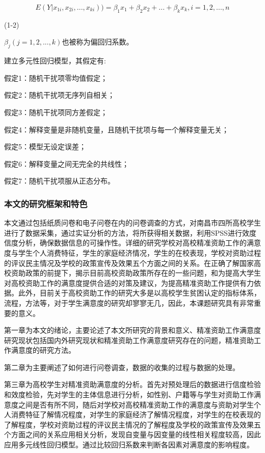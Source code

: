 \documentclass[UTF8,a4paper,12pt]{ctexart}  %
\begin{document}
\[E(Y|x_{1i},x_{2i},...,x_{ki}))=\beta_{1}x_{1}+\beta_{2}x_{2}+...+\beta_{k}x_{k},i=1,2,...,n\]

(1-2)

\(\beta_{j}(j=1,2,...,k)\)也被称为偏回归系数。

建立多元性回归模型，其假定有:

假定1：随机干扰项零均值假定；

假定2：随机干扰项无序列自相关；

假定3：随机干扰项同方差假定；

假定4：解释变量是非随机变量，且随机干扰项与每一个解释变量无关；

假定5：模型无设定误差；

假定6：解释变量之间无完全的共线性；

假定7：随机干扰项服从正态分布。

\hypertarget{section-11}{%
\subsubsection{本文的研究框架和特色}\label{section-11}}

本文通过包括纸质问卷和电子问卷在内的问卷调查的方式，对南昌市四所高校学生进行了数据采集，通过实证分析的方法，将所获得相关数据，利用SPSS进行效度信度分析，确保数据信息的可操作性。详细的研究学校对高校精准资助工作的满意度与学生个人消费特征，学生的家庭经济情况，学生的在校表现，学校对资助过程的评议民主情况及学校的政策宣传及效果五个方面之间的关系。在正确了解国家高校资助政策的前提下，揭示目前高校资助政策所存在的一些问题，和为提高大学生对高校资助工作的满意度提供合适的对策及建议，为提高精准资助工作提供有力依据。此外，目前关于高校资助工作的研究大多是以高校学生贫困认定的指标体系，流程，方法等，对于学生满意度的研究却寥寥无几，因此，本课题研究具有非常重要的意义。

第一章为本文的绪论，主要论述了本文所研究的背景和意义、精准资助工作满意度研究现状包括国内外研究现状和精准资助工作满意度研究存在的问题，精准资助工作满意度的研究方法。

第二章为主要阐述了如何进行问卷调查，数据的收集的过程与数据的处理。

第三章为高校学生对精准资助满意度的分析。首先对预处理后的数据进行信度检验和效度检验，先对学生的主体信息进行分析，如性别、户籍等与学生对资助工作满意度之间是否有所不同，随后对学校对高校精准资助工作的满意度与资助对学生个人消费特征了解情况程度，对学生的家庭经济了解情况程度，对学生的在校表现的了解程度，学校对资助过程的评议民主情况的了解程度及学校的政策宣传及效果五个方面之间的关系应用相关分析，发现自变量与因变量的线性相关程度较高，因此应用多元线性回归模型。通过比较回归系数来判断各因素对满意度的影响程度。
\end{document}
